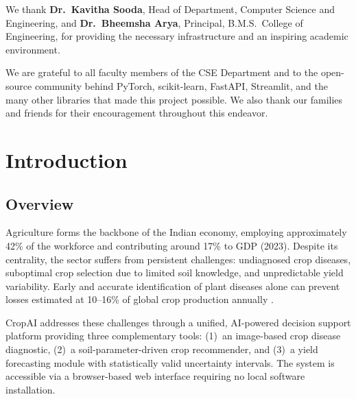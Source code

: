 \documentclass[12pt,a4paper]{report}
\begin{document}
We thank \textbf{Dr.~Kavitha Sooda}, Head of Department, Computer Science and Engineering, and \textbf{Dr.~Bheemsha Arya}, Principal, B.M.S.\ College of Engineering, for providing the necessary infrastructure and an inspiring academic environment.

We are grateful to all faculty members of the CSE Department and to the open-source community behind PyTorch, scikit-learn, FastAPI, Streamlit, and the many other libraries that made this project possible. We also thank our families and friends for their encouragement throughout this endeavor.

\newpage
\tableofcontents\thispagestyle{empty}\newpage
\listoffigures\thispagestyle{empty}\newpage
\listoftables\thispagestyle{empty}

\clearpage
{}
\setcounter{page}{1}

\chapter{Introduction}

\section{Overview}
Agriculture forms the backbone of the Indian economy, employing approximately 42\% of the workforce and contributing around 17\% to GDP (2023). Despite its centrality, the sector suffers from persistent challenges: undiagnosed crop diseases, suboptimal crop selection due to limited soil knowledge, and unpredictable yield variability. Early and accurate identification of plant diseases alone can prevent losses estimated at 10--16\% of global crop production annually \cite{savary2019global}.

CropAI addresses these challenges through a unified, AI-powered decision support platform providing three complementary tools: (1)~an image-based crop disease diagnostic, (2)~a soil-parameter-driven crop recommender, and (3)~a yield forecasting module with statistically valid uncertainty intervals. The system is accessible via a browser-based web interface requiring no local software installation.
\end{document}
